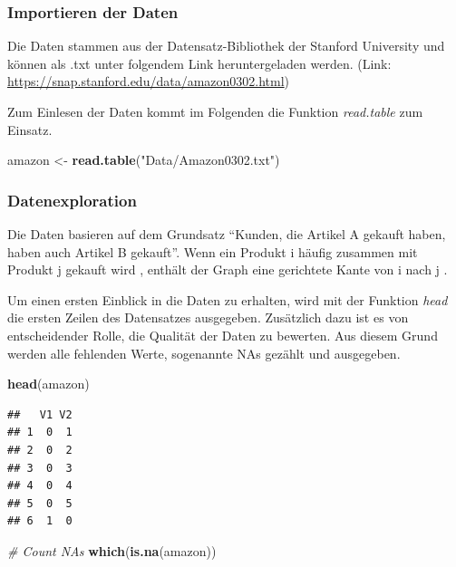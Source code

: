 \documentclass[
  12 pt,
]{article}
\newenvironment{Shaded}{\begin{snugshade}}{\end{snugshade}}
\newcommand{\CommentTok}[1]{\textcolor[rgb]{0.56,0.35,0.01}{\textit{#1}}}
\newcommand{\KeywordTok}[1]{\textcolor[rgb]{0.13,0.29,0.53}{\textbf{#1}}}
\newcommand{\NormalTok}[1]{#1}
\newcommand{\StringTok}[1]{\textcolor[rgb]{0.31,0.60,0.02}{#1}}
\begin{document}
\hypertarget{importieren-der-daten}{%
\subsubsection{Importieren der Daten}\label{importieren-der-daten}}

Die Daten stammen aus der Datensatz-Bibliothek der Stanford University
und können als .txt unter folgendem Link heruntergeladen werden. (Link:
\url{https://snap.stanford.edu/data/amazon0302.html})

Zum Einlesen der Daten kommt im Folgenden die Funktion
\textit{read.table} zum Einsatz.\\

\begin{Shaded}
\begin{Highlighting}[]
\NormalTok{amazon <-}\StringTok{ }\KeywordTok{read.table}\NormalTok{(}\StringTok{"Data/Amazon0302.txt"}\NormalTok{)}
\end{Highlighting}
\end{Shaded}

\hypertarget{datenexploration}{%
\subsubsection{Datenexploration}\label{datenexploration}}

Die Daten basieren auf dem Grundsatz ``Kunden, die Artikel A gekauft
haben, haben auch Artikel B gekauft''. Wenn ein Produkt i häufig
zusammen mit Produkt j gekauft wird , enthält der Graph eine gerichtete
Kante von i nach j .

Um einen ersten Einblick in die Daten zu erhalten, wird mit der Funktion
\textit{head} die ersten Zeilen des Datensatzes ausgegeben. Zusätzlich
dazu ist es von entscheidender Rolle, die Qualität der Daten zu
bewerten. Aus diesem Grund werden alle fehlenden Werte, sogenannte NAs
gezählt und ausgegeben.\\

\begin{Shaded}
\begin{Highlighting}[]
\KeywordTok{head}\NormalTok{(amazon)}
\end{Highlighting}
\end{Shaded}

\begin{verbatim}
##   V1 V2
## 1  0  1
## 2  0  2
## 3  0  3
## 4  0  4
## 5  0  5
## 6  1  0
\end{verbatim}

\begin{Shaded}
\begin{Highlighting}[]
\CommentTok{# Count NAs}
\KeywordTok{which}\NormalTok{(}\KeywordTok{is.na}\NormalTok{(amazon))}
\end{Highlighting}
\end{Shaded}
\end{document}
